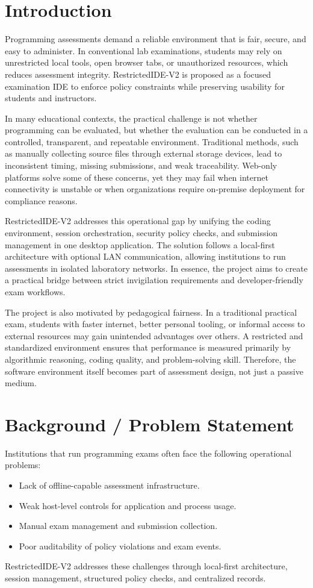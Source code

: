 \documentclass[12pt,a4paper]{report}
\begin{document}
	\section{Introduction}
	Programming assessments demand a reliable environment that is fair, secure, and easy to administer. In conventional lab examinations, students may rely on unrestricted local tools, open browser tabs, or unauthorized resources, which reduces assessment integrity. RestrictedIDE-V2 is proposed as a focused examination IDE to enforce policy constraints while preserving usability for students and instructors.
	
	In many educational contexts, the practical challenge is not whether programming can be evaluated, but whether the evaluation can be conducted in a controlled, transparent, and repeatable environment. Traditional methods, such as manually collecting source files through external storage devices, lead to inconsistent timing, missing submissions, and weak traceability. Web-only platforms solve some of these concerns, yet they may fail when internet connectivity is unstable or when organizations require on-premise deployment for compliance reasons.
	
	RestrictedIDE-V2 addresses this operational gap by unifying the coding environment, session orchestration, security policy checks, and submission management in one desktop application. The solution follows a local-first architecture with optional LAN communication, allowing institutions to run assessments in isolated laboratory networks. In essence, the project aims to create a practical bridge between strict invigilation requirements and developer-friendly exam workflows.
	
	The project is also motivated by pedagogical fairness. In a traditional practical exam, students with faster internet, better personal tooling, or informal access to external resources may gain unintended advantages over others. A restricted and standardized environment ensures that performance is measured primarily by algorithmic reasoning, coding quality, and problem-solving skill. Therefore, the software environment itself becomes part of assessment design, not just a passive medium.
	
	\section{Background / Problem Statement}
	Institutions that run programming exams often face the following operational problems:
	\begin{itemize}
		\item Lack of offline-capable assessment infrastructure.
		\item Weak host-level controls for application and process usage.
		\item Manual exam management and submission collection.
		\item Poor auditability of policy violations and exam events.
	\end{itemize}
	RestrictedIDE-V2 addresses these challenges through local-first architecture, session management, structured policy checks, and centralized records.
	
\end{document}
